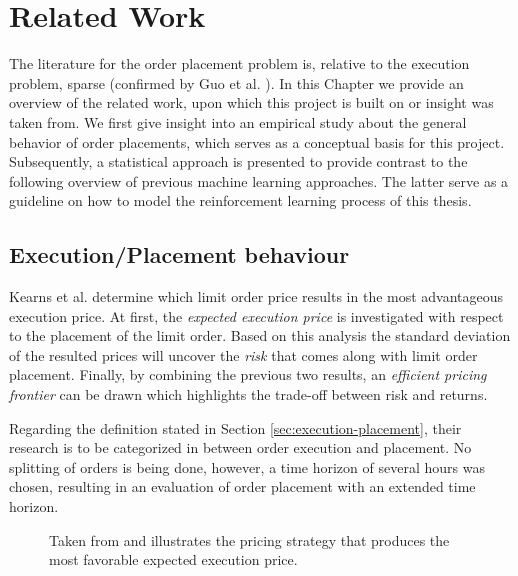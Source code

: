 \chapter{Related Work}
\label{chap:related-work}

The literature for the order placement problem is, relative to the execution problem, sparse (confirmed by Guo et al. \cite{guo2013optimal}).
In this Chapter we provide an overview of the related work, upon which this project is built on or insight was taken from.
We first give insight into an empirical study about the general behavior of order placements, which serves as a conceptual basis for this project.
Subsequently, a statistical approach is presented to provide contrast to the following overview of previous machine learning approaches.
The latter serve as a guideline on how to model the reinforcement learning process of this thesis.

\section{Execution/Placement behaviour}

Kearns et al. \cite{nevmyvaka2005electronic} determine which limit order price results in the most advantageous execution price.
At first, the \textit{expected execution price} is investigated with respect to the placement of the limit order. 
Based on this analysis the standard deviation of the resulted prices will uncover the \textit{risk} that comes along with limit order placement. 
Finally, by combining the previous two results, an \textit{efficient pricing frontier} can be drawn which highlights the trade-off between risk and returns.

Regarding the definition stated in Section \ref{sec:execution-placement}, their research is to be categorized in between order execution and placement.
No splitting of orders is being done, however, a time horizon of several hours was chosen, resulting in an evaluation of order placement with an extended time horizon.

\begin{figure}[H]
    \centering
    \caption{Taken from \cite{nevmyvaka2005electronic} and illustrates the pricing strategy that produces the most favorable expected execution price.}
    \label{fig:kearns-return}
\end{figure}

